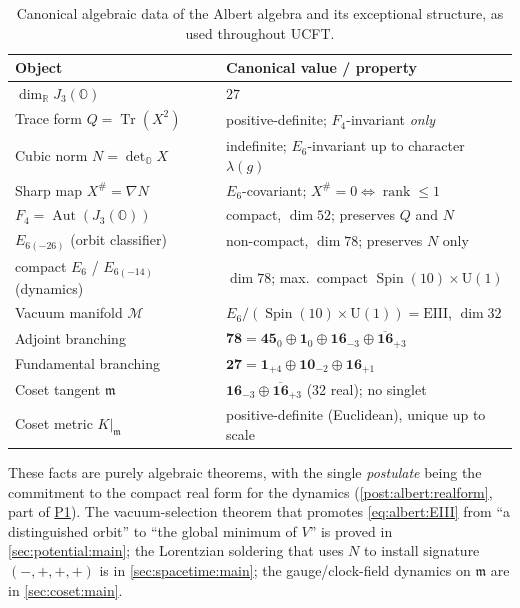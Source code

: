 \begin{table}[ht]
\centering
\renewcommand{\arraystretch}{1.3}
\begin{tabular}{ll}
\hline
Object & Canonical value / property \\
\hline
$\dim_{\mathbb{R}} J_{3}(\mathbb{O})$ & $27$ \\
Trace form $Q=\operatorname{Tr}(X^{2})$ & positive-definite; $F_{4}$-invariant \emph{only} \\
Cubic norm $N=\det_{\mathbb{O}}X$ & indefinite; $E_{6}$-invariant up to character $\lambda(g)$ \\
Sharp map $X^{\#}=\nabla N$ & $E_{6}$-covariant; $X^{\#}=0\Leftrightarrow\operatorname{rank}\le1$ \\
$F_{4}=\operatorname{Aut}(J_{3}(\mathbb{O}))$ & compact, $\dim 52$; preserves $Q$ and $N$ \\
$E_{6(-26)}$ (orbit classifier) & non-compact, $\dim 78$; preserves $N$ only \\
compact $E_{6}$ / $E_{6(-14)}$ (dynamics) & $\dim 78$; max.\ compact $\operatorname{Spin}(10)\times\mathrm{U}(1)$ \\
Vacuum manifold $\mathcal{M}$ & $E_{6}/(\operatorname{Spin}(10)\times\mathrm{U}(1))=\mathrm{EIII}$, $\dim 32$ \\
Adjoint branching & $\mathbf{78}=\mathbf{45}_{0}\oplus\mathbf{1}_{0}\oplus\mathbf{16}_{-3}\oplus\overline{\mathbf{16}}_{+3}$ \\
Fundamental branching & $\mathbf{27}=\mathbf{1}_{+4}\oplus\mathbf{10}_{-2}\oplus\mathbf{16}_{+1}$ \\
Coset tangent $\mathfrak{m}$ & $\mathbf{16}_{-3}\oplus\overline{\mathbf{16}}_{+3}$ (32 real); no singlet \\
Coset metric $K|_{\mathfrak{m}}$ & positive-definite (Euclidean), unique up to scale \\
\hline
\end{tabular}
\caption{Canonical algebraic data of the Albert algebra and its
exceptional structure, as used throughout UCFT.}
\label{tab:albert:summary}
\end{table}

These facts are purely algebraic theorems, with the single
\emph{postulate} being the commitment to the compact real form for the
dynamics (\autoref{post:albert:realform}, part of
\hyperref[post:potential:P1]{P1}). The vacuum-selection theorem that
promotes \eqref{eq:albert:EIII} from ``a distinguished orbit'' to ``the
global minimum of $V$'' is proved in \autoref{sec:potential:main}; the
Lorentzian soldering that uses $N$ to install signature $(-,+,+,+)$ is in
\autoref{sec:spacetime:main}; the gauge/clock-field dynamics on
$\mathfrak{m}$ are in \autoref{sec:coset:main}.

